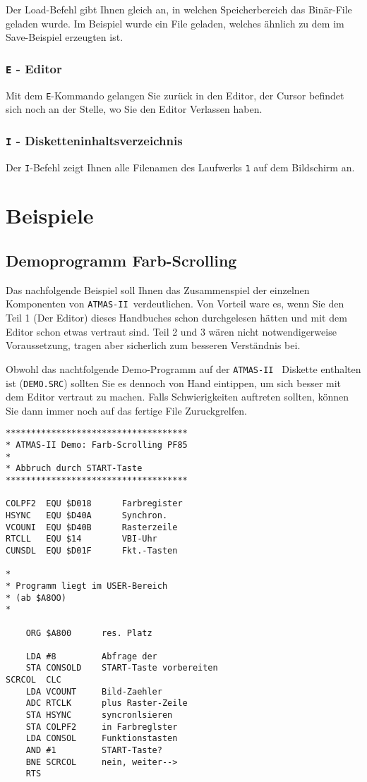 \documentclass[10pt,a4paper,twoside,final,openright,titlepage]{memoir}
\def\atmas{\texttt{AT\-MAS-II }}
\begin{document}
Der Load-Befehl gibt Ihnen gleich an, in welchen
Speicherbereich das Binär-File geladen wurde. Im
Beispiel wurde ein File geladen, welches ähnlich
zu dem im Save-Beispiel erzeugten ist.

\subsection{\texttt{E} - Editor}

Mit dem \texttt{E}-Kommando gelangen Sie zurück in den Editor,
der Cursor befindet sich noch an der Stelle, wo Sie
den Editor Verlassen haben.

\subsection{\texttt{I} - Disketteninhaltsverzeichnis}

Der \texttt{I}-Befehl zeigt Ihnen alle Filenamen des Laufwerks
\texttt{1} auf dem Bildschirm an.

\chapter{Beispiele}

\section{Demoprogramm Farb-Scrolling}

Das nachfolgende Beispiel soll Ihnen das Zusammenspiel
der einzelnen Komponenten von \atmas verdeutlichen.
Von Vorteil ware es, wenn Sie den Teil 1  (Der Editor)
dieses Handbuches schon durchgelesen hätten und mit dem
Editor schon etwas vertraut sind. Teil 2 und 3 wären
nicht notwendigerweise Voraussetzung, tragen aber
sicherlich zum besseren Verständnis bei.

Obwohl das nachtfolgende Demo-Programm auf der \atmas
Diskette enthalten ist (\texttt{DEMO.SRC}) sollten Sie es
dennoch von Hand eintippen, um sich besser mit dem Editor
vertraut zu machen. Falls Schwierigkeiten auftreten
sollten, können Sie dann immer noch auf das fertige
File Zuruckgrelfen.

\begin{Verbatim}
************************************
* ATMAS-II Demo: Farb-Scrolling PF85
*
* Abbruch durch START-Taste
************************************

COLPF2  EQU $D018      Farbregister
HSYNC   EQU $D40A      Synchron.
VCOUNI  EQU $D40B      Rasterzeile
RTCLL   EQU $14        VBI-Uhr
CUNSDL  EQU $D01F      Fkt.-Tasten

*
* Programm liegt im USER-Bereich
* (ab $A8OO)
*

	ORG $A800      res. Platz

	LDA #8         Abfrage der
	STA CONSOLD    START-Taste vorbereiten
SCRCOL  CLC
	LDA VCOUNT     Bild-Zaehler
	ADC RTCLK      plus Raster-Zeile
	STA HSYNC      syncronlsieren
	STA COLPF2     in Farbreglster
	LDA CONSOL     Funktionstasten
	AND #1         START-Taste?
	BNE SCRCOL     nein, weiter-->
	RTS
\end{Verbatim}
\end{document}
